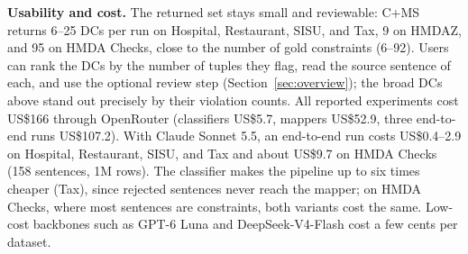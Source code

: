 \smallskip\noindent\textbf{Usability and cost.}
The returned set stays small and reviewable: C+MS returns 6--25 DCs per run on Hospital, Restaurant, SISU, and Tax, 9 on HMDAZ, and 95 on HMDA Checks, close to the number of gold constraints (6--92). Users can rank the DCs by the number of tuples they flag, read the source sentence of each, and use the optional review step (Section~\ref{sec:overview}); the broad DCs above stand out precisely by their violation counts.
All reported experiments cost US\$166 through OpenRouter (classifiers US\$5.7, mappers US\$52.9, three end-to-end runs US\$107.2). With Claude Sonnet 5.5, an end-to-end run costs US\$0.4--2.9 on Hospital, Restaurant, SISU, and Tax and about US\$9.7 on HMDA Checks (158 sentences, 1M rows). The classifier makes the pipeline up to six times cheaper (Tax), since rejected sentences never reach the mapper; on HMDA Checks, where most sentences are constraints, both variants cost the same. Low-cost backbones such as GPT-6 Luna and DeepSeek-V4-Flash cost a few cents per dataset.
